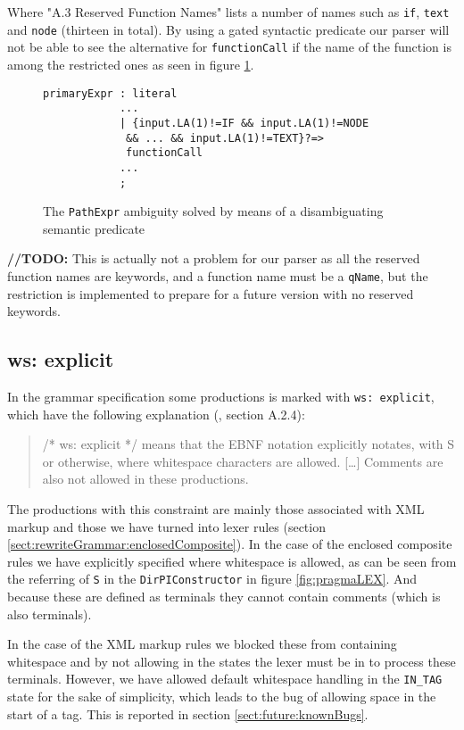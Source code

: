 Where "A.3 Reserved Function Names" lists a number of names such as \verb!if!, \verb!text! and \verb!node! (thirteen in total). By using a gated syntactic predicate our parser will not be able to see the alternative for \verb!functionCall! if the name of the function is among the restricted ones as seen in figure \ref{fig:reservedFunction}.

\begin{figure}[h!]
\begin{verbatim}
primaryExpr : literal 
            ...
            | {input.LA(1)!=IF && input.LA(1)!=NODE
             && ... && input.LA(1)!=TEXT}?=>
             functionCall 
            ...
            ;
\end{verbatim}
\caption[The \texttt{PathExpr} ambiguity solved]{The \texttt{PathExpr} ambiguity solved by means of a disambiguating semantic predicate}
\label{fig:reservedFunction}
\end{figure}

\textbf{\LARGE //TODO:} This is actually not a problem for our parser as all the reserved function names are keywords, and a function name must be a \verb!qName!, but the restriction is implemented to prepare for a future version with no reserved keywords.

\subsection{ws: explicit}
In the grammar specification some productions is marked with \verb!ws: explicit!, which have the following explanation (\cite{w3c00}, section A.2.4):
\begin{quote}
/* ws: explicit */ means that the EBNF notation explicitly notates, with S or otherwise, where whitespace characters are allowed. [\ldots] Comments are also not allowed in these productions.
\end{quote} 

The productions with this constraint are mainly those associated with XML markup and those we have turned into lexer rules (section \ref{sect:rewriteGrammar:enclosedComposite}). In the case of the enclosed composite rules we have explicitly specified where whitespace is allowed, as can be seen from the referring of \verb!S! in the \verb!DirPIConstructor! in figure \ref{fig:pragmaLEX}. And because these are defined as terminals they cannot contain comments (which is also terminals).

In the case of the XML markup rules we blocked these from containing whitespace and by not allowing in the states the lexer must be in to process these terminals. However, we have allowed default whitespace handling in the \verb!IN_TAG! state for the sake of simplicity, which leads to the bug of allowing space in the start of a tag. This is reported in section \ref{sect:future:knownBugs}.

